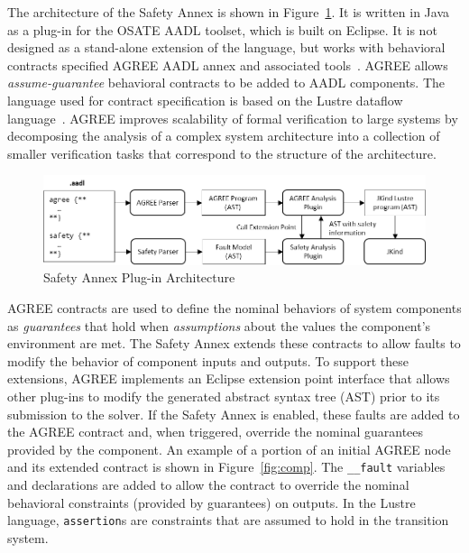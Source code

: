 The architecture of the Safety Annex is shown in Figure~\ref{fig:plugin-arch}.  It is written in Java as a plug-in for the OSATE AADL toolset, which is built on Eclipse.  It is not designed as a stand-alone extension of the language, but works with behavioral contracts specified AGREE AADL annex and associated tools~\cite{NFM2012:CoGaMiWhLaLu}.  AGREE allows {\em assume-guarantee} behavioral contracts to be added to AADL components.  The language used for contract specification is based on the Lustre dataflow language~\cite{Halbwachs91:IEEE}. AGREE improves scalability of formal verification to large systems by decomposing the analysis of a complex system architecture into a collection of smaller verification tasks that correspond to the structure of the architecture.

\begin{figure}
	\begin{center}
		\includegraphics[width=.9\textwidth]{images/arch.png}
	\end{center}
	\vspace{-0.2in}
	\caption{Safety Annex Plug-in Architecture}
	\label{fig:plugin-arch}
\end{figure}

AGREE contracts are used to define the nominal behaviors of system components as {\em guarantees} that hold when {\em assumptions} about the values the component's environment are met.  The Safety Annex extends these contracts to allow faults to modify the behavior of component inputs and outputs.  To support these extensions, AGREE implements an Eclipse extension point interface that allows other plug-ins to modify the generated abstract syntax tree (AST) prior to its submission to the solver.  If the Safety Annex is enabled, these faults are added to the AGREE contract and, when triggered, override the nominal guarantees provided by the component.  An example of a portion of an initial AGREE node and its extended contract is shown in Figure~\ref{fig:comp}.  The \texttt{\_\_fault} variables and declarations are added to allow the contract to override the nominal behavioral constraints (provided by guarantees) on outputs.  In the Lustre language, \texttt{assertion}s are constraints that are assumed to hold in the transition system.

